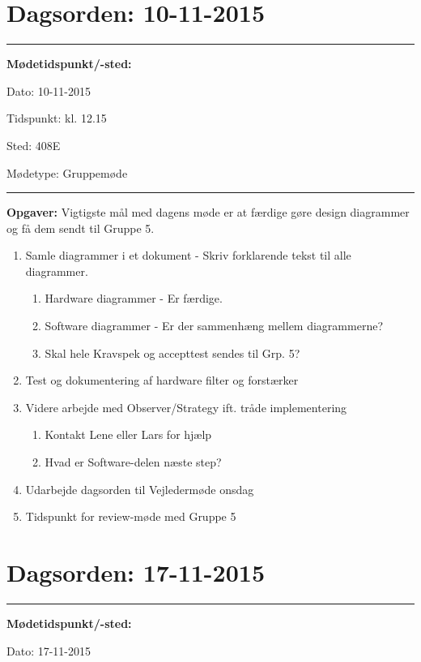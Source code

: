 \newpage
\section{Dagsorden: 10-11-2015}
\hrule



\textbf{Mødetidspunkt/-sted:} 

Dato: \tabto{7em} 10-11-2015

Tidspunkt: \tabto{7em} kl. 12.15

Sted: \tabto{7em} 408E

Mødetype: \tabto{7em} Gruppemøde \newline


\hrule
\textbf{Opgaver:} \newline
Vigtigste mål med dagens møde er at færdige gøre design diagrammer og få dem sendt til Gruppe 5.
\begin{enumerate}
\item Samle diagrammer i et dokument - Skriv forklarende tekst til alle diagrammer.
\begin{enumerate}
\item Hardware diagrammer - Er færdige.
\item Software diagrammer - Er der sammenhæng mellem diagrammerne?
\item Skal hele Kravspek og accepttest sendes til Grp. 5?
\end{enumerate}
\item Test og dokumentering af hardware filter og forstærker
\item Videre arbejde med Observer/Strategy ift. tråde implementering
\begin{enumerate}
\item Kontakt Lene eller Lars for hjælp
\item Hvad er Software-delen næste step?
\end{enumerate}
\item Udarbejde dagsorden til Vejledermøde onsdag
\item Tidspunkt for review-møde med Gruppe 5
\end{enumerate}


\newpage
\section{Dagsorden: 17-11-2015}
\hrule



\textbf{Mødetidspunkt/-sted:} 

Dato: \tabto{7em} 17-11-2015

